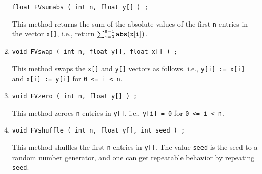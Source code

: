 \begin{enumerate}
\begin{verbatim}
float FVsumabs ( int n, float y[] ) ;
\end{verbatim}
This method returns the sum of the absolute values of the 
first {\tt n} entries in the vector {\tt x[]},
i.e., return
$\sum_{\tt i = 0}^{\tt n-1} {\tt abs(x[i])}$.
\item
\begin{verbatim}
void FVswap ( int n, float y[], float x[] ) ;
\end{verbatim}
This method swaps the {\tt x[]} and {\tt y[]} vectors as follows.
i.e.,
{\tt y[i] := x[i]} and
{\tt x[i] := y[i]} 
for {\tt 0 <= i < n}.
\item
\begin{verbatim}
void FVzero ( int n, float y[] ) ;
\end{verbatim}
This method zeroes {\tt n} entries in {\tt y[]},
i.e.,
{\tt y[i] = 0} 
for {\tt 0 <= i < n}.
\item
\begin{verbatim}
void FVshuffle ( int n, float y[], int seed ) ;
\end{verbatim}
This method shuffles the first {\tt n} entries in {\tt y[]}.
The value {\tt seed} is the seed to a random number generator,
and one can get repeatable behavior by repeating {\tt seed}.
\end{enumerate}
